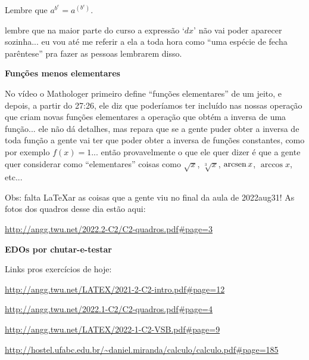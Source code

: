 \documentclass[oneside,12pt]{article}
\begin{document}
Lembre que $a^{b^c} = a^{(b^c)}$.

\bsk

 lembre que na maior parte do curso a
expressão `$dx$' não vai poder aparecer sozinha... eu vou até me
referir a ela a toda hora como ``uma espécie de fecha parêntese'' pra
fazer as pessoas lembrarem disso.


\newpage


{\bf Funções menos elementares}

No vídeo o Mathologer primeiro define ``funções elementares'' de um
jeito, e depois, a partir do 27:26, ele diz que poderíamos ter
incluído nas nossas operação que criam novas funções elementares a
operação que obtém a inversa de uma função... ele não dá detalhes, mas
repara que se a gente puder obter a inversa de toda função a gente vai
ter que poder obter a inversa de funções constantes, como por exemplo
$f(x)=1$... então provavelmente o que ele quer dizer é que a gente
quer considerar como ``elementares'' coisas como $\sqrt{x}$,
$\sqrt[3]{x}$, $\operatorname{arcsen} x$, $\arccos x$, etc...

\bsk

Obs: falta \LaTeX ar as coisas que a gente viu no final da aula de
2022aug31! As fotos dos quadros desse dia estão aqui:

\url{http://angg.twu.net/2022.2-C2/C2-quadros.pdf\#page=3}


\newpage


{\bf EDOs por chutar-e-testar}

Links pros exercícios de hoje:

\ssk

{\footnotesize

\url{http://angg.twu.net/LATEX/2021-2-C2-intro.pdf#page=12}

\url{http://angg.twu.net/2022.1-C2/C2-quadros.pdf\#page=4}

\url{http://angg.twu.net/LATEX/2022-1-C2-VSB.pdf\#page=9}

\url{http://hostel.ufabc.edu.br/~daniel.miranda/calculo/calculo.pdf\#page=185}

}
\end{document}
